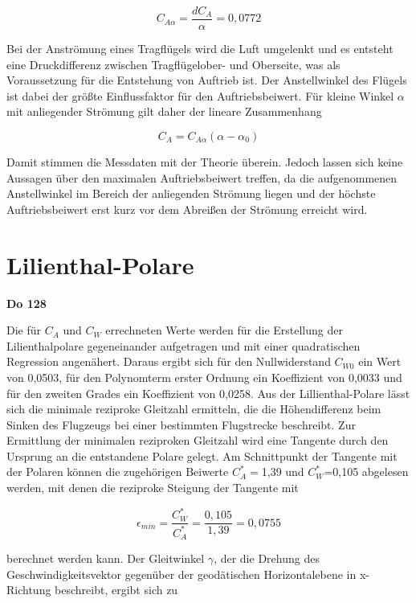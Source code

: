\begin{equation}
C_{A\alpha}=\frac{dC_A}{\alpha}=0,0772
\end{equation}

	
Bei der Anströmung eines Tragflügels wird die Luft umgelenkt und es entsteht eine Druckdifferenz zwischen Tragflügelober- und Oberseite, was als Voraussetzung für die Entstehung von Auftrieb ist. Der Anstellwinkel des Flügels ist dabei der größte Einflussfaktor für den Auftriebsbeiwert. Für kleine Winkel $\alpha$ mit anliegender Strömung gilt daher der lineare Zusammenhang

\begin{equation}
C_A=C_{A\alpha} \left(\alpha - \alpha_0\right)
\end{equation}

Damit stimmen die Messdaten mit der Theorie überein. Jedoch lassen sich keine Aussagen über den maximalen Auftriebsbeiwert treffen, da die aufgenommenen Anstellwinkel im Bereich der anliegenden Strömung liegen und der höchste Auftriebsbeiwert erst kurz vor dem Abreißen der Strömung erreicht wird. 

\section{Lilienthal-Polare}

\textbf{Do 128}

Die für $C_A$ und $C_W$ errechneten Werte werden für die Erstellung der Lilienthalpolare gegeneinander aufgetragen und mit einer quadratischen Regression angenähert. Daraus ergibt sich für den Nullwiderstand $C_{W0}$ ein Wert von 0,0503, für den Polynomterm erster Ordnung ein Koeffizient von 0,0033 und für den zweiten Grades ein Koeffizient von 0,0258. 
Aus der Lillienthal-Polare lässt sich die minimale reziproke Gleitzahl ermitteln, die die Höhendifferenz beim Sinken des Flugzeugs bei einer bestimmten Flugstrecke beschreibt. Zur Ermittlung der minimalen reziproken Gleitzahl wird eine Tangente durch den Ursprung an die entstandene Polare gelegt. Am Schnittpunkt der Tangente mit der Polaren können die zugehörigen Beiwerte $C_A^*=$1,39 und  $C_W^*$=0,105 abgelesen werden, mit denen die reziproke Steigung der Tangente mit

\begin{equation}
\epsilon_{min}=\frac{C_{W}^{\ast}}{C_{A}^{\ast}}=\frac{0,105}{1,39}=0,0755
\end{equation}

berechnet werden kann. Der Gleitwinkel $\gamma$, der die Drehung des Geschwindigkeitsvektor gegenüber der geodätischen Horizontalebene in x-Richtung beschreibt, ergibt sich zu

